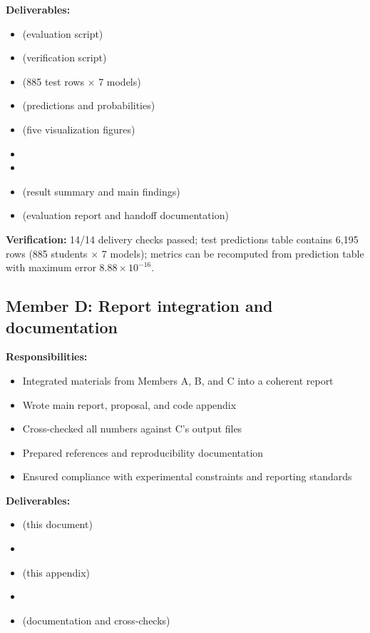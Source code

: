 \textbf{Deliverables:}
\begin{itemize}[leftmargin=*]
  \item {} (evaluation script)
  \item {} (verification script)
  \item {} (885 test rows $\times$ 7 models)
  \item {} (predictions and probabilities)
  \item {} (five visualization figures)
  \item {}
  \item {}
  \item {} (result summary and main findings)
  \item {} (evaluation report and handoff documentation)
\end{itemize}

\textbf{Verification:} 14/14 delivery checks passed; test predictions table contains 6,195 rows (885 students $\times$ 7 models); metrics can be recomputed from prediction table with maximum error $8.88 \times 10^{-16}$.

\subsection{Member D: Report integration and documentation}

\textbf{Responsibilities:}
\begin{itemize}[leftmargin=*]
  \item Integrated materials from Members A, B, and C into a coherent report
  \item Wrote main report, proposal, and code appendix
  \item Cross-checked all numbers against C's output files
  \item Prepared references and reproducibility documentation
  \item Ensured compliance with experimental constraints and reporting standards
\end{itemize}

\textbf{Deliverables:}
\begin{itemize}[leftmargin=*]
  \item {} (this document)
  \item {}
  \item {} (this appendix)
  \item {}
  \item {} (documentation and cross-checks)
\end{itemize}

